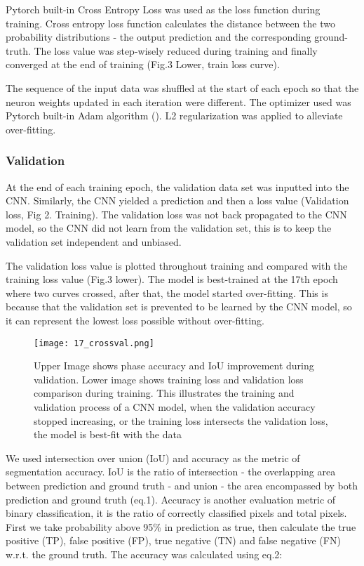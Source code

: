 \documentclass[draft,linenumbers]{agujournal2018}
\begin{document}
Pytorch built-in Cross Entropy Loss was used as the loss function during training. Cross entropy loss function calculates the distance between the two probability distributions - the output prediction and the corresponding ground-truth. The loss value was step-wisely reduced during training and finally converged at the end of training (Fig.3 Lower, train loss curve). 

The sequence of the input data was shuffled at the start of each epoch so that the neuron weights updated in each iteration were different. The optimizer used was Pytorch built-in Adam algorithm (\citet{kingma2014adam}). L2 regularization was applied to alleviate over-fitting.

\subsubsection{Validation}
At the end of each training epoch, the validation data set was inputted into the CNN. Similarly, the CNN yielded a prediction and then a loss value (Validation loss, Fig 2. Training). The validation loss was not back propagated to the CNN model, so the CNN did not learn from the validation set, this is to keep the validation set independent and unbiased.

The validation loss value is plotted throughout training and compared with the training loss value (Fig.3 lower). The model is best-trained at the 17th epoch where two curves crossed, after that, the model started over-fitting. This is because that the validation set is prevented to be learned by the CNN model, so it can represent the lowest loss possible without over-fitting.

\begin{figure}[h]
 \centering
 \texttt{[image: 17\_crossval.png]}
 \caption{Upper Image shows phase accuracy and IoU improvement during validation. Lower image shows training loss and validation loss comparison during training. This illustrates the training and validation process of a CNN model, when the validation accuracy stopped increasing, or the training loss intersects the validation loss, the model is best-fit with the data}
 \label{fig2}
 \end{figure}
 
 We used intersection over union (IoU) and accuracy as the metric of segmentation accuracy. IoU is the ratio of intersection - the overlapping area between prediction and ground truth - and union - the area encompassed by both prediction and ground truth (eq.1). Accuracy is another evaluation metric of binary classification, it is the ratio of correctly classified pixels and total pixels. First we take probability above 95\% in prediction as true, then calculate the true positive (TP), false positive (FP), true negative (TN) and false negative (FN) w.r.t. the ground truth. The accuracy was calculated using eq.2:
\end{document}
